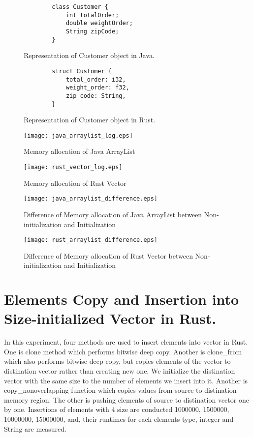 \begin{figure}[htb]
    \begin{lstlisting}
        class Customer {
            int totalOrder;
            double weightOrder;
            String zipCode;
        }
    \end{lstlisting}
    \caption{Representation of Customer object in Java.}
    \label{fig:Sampling}    
\end{figure}

\begin{figure}[htb]
    \begin{lstlisting}
        struct Customer {
            total_order: i32,
            weight_order: f32,
            zip_code: String,
        }
    \end{lstlisting}
    \caption{Representation of Customer object in Rust.}
    \label{fig:Sampling}
\end{figure}

\begin{figure}[htb]
    \texttt{[image: java\_arraylist\_log.eps]}
    \caption{Memory allocation of Java ArrayList}
    \label{fig:Sampling}
\end{figure}

\begin{figure}[htb]
    \texttt{[image: rust\_vector\_log.eps]}
    \caption{Memory allocation of Rust Vector}
    \label{fig:Sampling}
\end{figure}


\begin{figure}[htb]
    \texttt{[image: java\_arraylist\_difference.eps]}
    \caption{Difference of Memory allocation of Java ArrayList between Non-initialization and Initialization}
    \label{fig:Sampling}
\end{figure}

\begin{figure}[htb]
    \texttt{[image: rust\_arraylist\_difference.eps]}
    \caption{Difference of Memory allocation of Rust Vector between Non-initialization and Initialization}
    \label{fig:Sampling}
\end{figure}


\section{Elements Copy and Insertion into Size-initialized Vector in Rust.}
\label{sec:history}
In this experiment, four methods are used to insert elements into vector in Rust. One is clone method which performs bitwise deep copy. 
Another is clone_from which also performs bitwise deep copy, but copies elements of the vector to distination vector rather than 
creating new one. We initialize the distination vector with the same size to the number of elements we insert into it. 
Another is copy_nonoverlapping function which copies values from source to distination memory region. 
The other is pushing elements of source to distination vector one by one. Insertions of elements with 4 size are conducted 1000000, 1500000, 10000000, 15000000, and, 
their runtimes for each elements type, integer and String are measured. 


